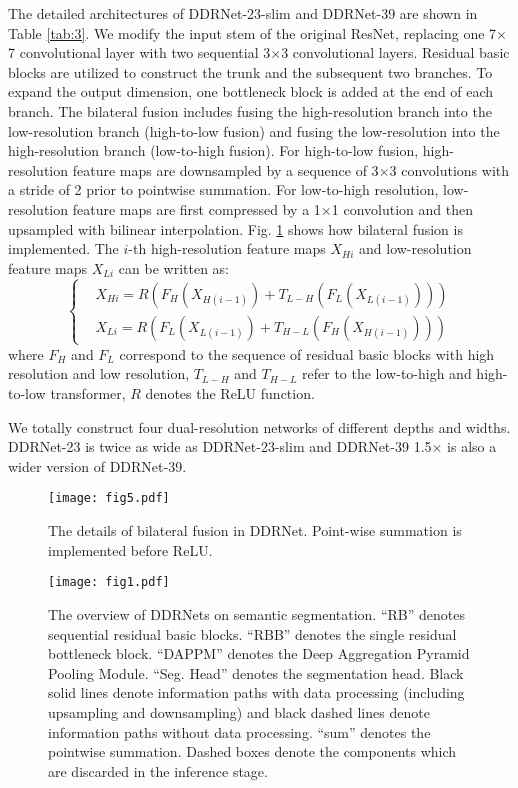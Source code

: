 \documentclass[journal]{IEEEtran}
\begin{document}
The detailed architectures of DDRNet-23-slim and DDRNet-39 are shown in Table \ref{tab:3}. We modify the input stem of the original ResNet, replacing one 7$\times$7 convolutional layer with two sequential 3$\times$3 convolutional layers. Residual basic blocks are utilized to construct the trunk and the subsequent two branches. To expand the output dimension, one bottleneck block is added at the end of each branch. The bilateral fusion includes fusing the high-resolution branch into the low-resolution branch (high-to-low fusion) and fusing the low-resolution into the high-resolution branch (low-to-high fusion). For high-to-low fusion, high-resolution feature maps are downsampled by a sequence of 3$\times$3 convolutions with a stride of 2 prior to pointwise summation. For low-to-high resolution, low-resolution feature maps are first compressed by a 1$\times$1 convolution and then upsampled with bilinear interpolation. Fig. \ref{fig5} shows how bilateral fusion is implemented. The $i$-th high-resolution feature maps $X_{Hi}$ and low-resolution feature maps $X_{Li}$ can be written as:
\begin{equation}
\left\{
\begin{aligned}
&X_{Hi} = R(F_H(X_{H(i-1)}) + T_{L-H}(F_L(X_{L(i-1)})))  \\
&X_{Li} = R(F_L(X_{L(i-1)}) + T_{H-L}(F_H(X_{H(i-1)})))
\end{aligned}
\right.
\label{eq1}
\end{equation}
where $F_H$ and $F_L$ correspond to the sequence of residual basic blocks with high resolution and low resolution, $T_{L-H}$ and $T_{H-L}$ refer to the low-to-high and high-to-low transformer, $R$ denotes the ReLU function.

We totally construct four dual-resolution networks of different depths and widths. DDRNet-23 is twice as wide as DDRNet-23-slim and DDRNet-39 1.5$\times$ is also a wider version of DDRNet-39.

\begin{figure}[H]
\centerline{\texttt{[image: fig5.pdf]}}
\caption{The details of bilateral fusion in DDRNet. Point-wise summation is implemented before ReLU.}
\label{fig5}
\end{figure}

\begin{figure*}
\centerline{\texttt{[image: fig1.pdf]}}
\caption{The overview of DDRNets on semantic segmentation. ``RB'' denotes sequential residual basic blocks. ``RBB'' denotes the single residual bottleneck block. ``DAPPM'' denotes the Deep Aggregation Pyramid Pooling Module. ``Seg. Head'' denotes the segmentation head. Black solid lines denote information paths with data processing (including upsampling and downsampling) and black dashed lines denote information paths without data processing. ``sum'' denotes the pointwise summation. Dashed boxes denote the components which are discarded in the inference stage.}
\label{fig1}
\end{figure*}
\end{document}
